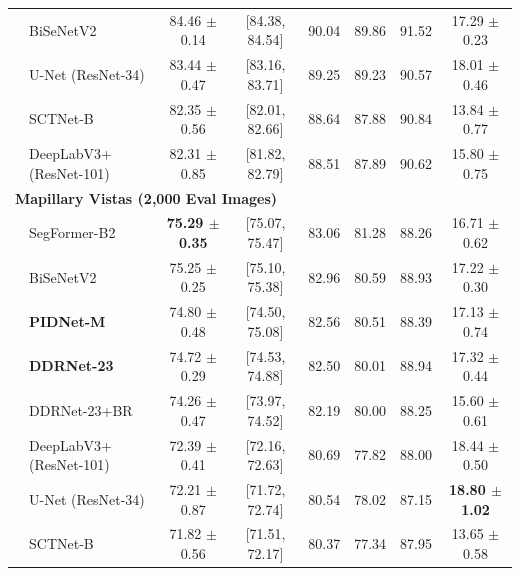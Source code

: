 \begin{table}[t]
{\begin{tabular}{llcccccc}
  & BiSeNetV2 & 84.46 $\pm$ 0.14 & [84.38, 84.54] & 90.04 & 89.86 & 91.52 & 17.29 $\pm$ 0.23 \\
  & U-Net (ResNet-34) & 83.44 $\pm$ 0.47 & [83.16, 83.71] & 89.25 & 89.23 & 90.57 & 18.01 $\pm$ 0.46 \\
  & SCTNet-B & 82.35 $\pm$ 0.56 & [82.01, 82.66] & 88.64 & 87.88 & 90.84 & 13.84 $\pm$ 0.77 \\
  & DeepLabV3+ (ResNet-101) & 82.31 $\pm$ 0.85 & [81.82, 82.79] & 88.51 & 87.89 & 90.62 & 15.80 $\pm$ 0.75 \\
\midrule
\multicolumn{8}{l}{\textbf{Mapillary Vistas (2,000 Eval Images)}} \\
  & SegFormer-B2 & \textbf{75.29 $\pm$ 0.35} & [75.07, 75.47] & 83.06 & 81.28 & 88.26 & 16.71 $\pm$ 0.62 \\
  & BiSeNetV2 & 75.25 $\pm$ 0.25 & [75.10, 75.38] & 82.96 & 80.59 & 88.93 & 17.22 $\pm$ 0.30 \\
  & \textbf{PIDNet-M} & 74.80 $\pm$ 0.48 & [74.50, 75.08] & 82.56 & 80.51 & 88.39 & 17.13 $\pm$ 0.74 \\
  & \textbf{DDRNet-23} & 74.72 $\pm$ 0.29 & [74.53, 74.88] & 82.50 & 80.01 & 88.94 & 17.32 $\pm$ 0.44 \\
  & DDRNet-23+BR & 74.26 $\pm$ 0.47 & [73.97, 74.52] & 82.19 & 80.00 & 88.25 & 15.60 $\pm$ 0.61 \\
  & DeepLabV3+ (ResNet-101) & 72.39 $\pm$ 0.41 & [72.16, 72.63] & 80.69 & 77.82 & 88.00 & 18.44 $\pm$ 0.50 \\
  & U-Net (ResNet-34) & 72.21 $\pm$ 0.87 & [71.72, 72.74] & 80.54 & 78.02 & 87.15 & \textbf{18.80 $\pm$ 1.02} \\
  & SCTNet-B & 71.82 $\pm$ 0.56 & [71.51, 72.17] & 80.37 & 77.34 & 87.95 & 13.65 $\pm$ 0.58 \\
\bottomrule
\end{tabular}%
}
\end{table}